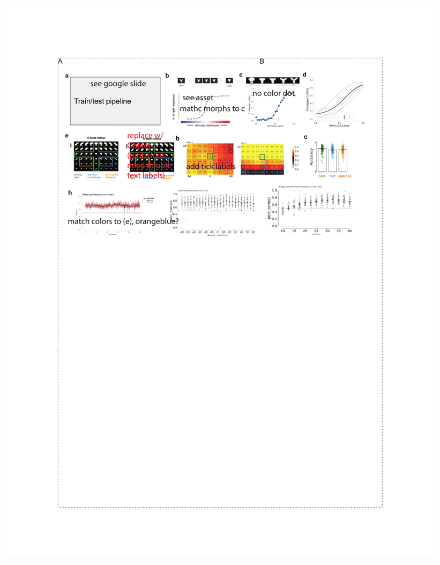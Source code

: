\begin{figure}[t!]
\includegraphics[width=\textwidth]{figures/chapter_1/fig_1-3_behavior_generalization/fig_1-3_behavior_generalization.pdf}
    \vspace{.1in}

\end{figure}

